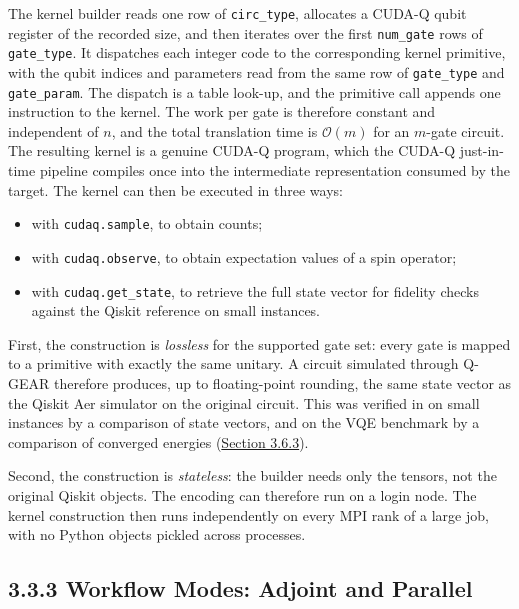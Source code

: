 \documentclass{report}
\theoremstyle{plain}
\theoremstyle{definition}
\theoremstyle{remark}
\newcommand{\bigO}[1]{\mathcal{O}\!\left(#1\right)}
\begin{document}
The kernel builder reads one row of \texttt{circ\_type}, allocates a CUDA-Q qubit register of the recorded size, and then iterates over the first \texttt{num\_gate} rows of \texttt{gate\_type}. It dispatches each integer code to the corresponding kernel primitive, with the qubit indices and parameters read from the same row of \texttt{gate\_type} and \texttt{gate\_param}. The dispatch is a table look-up, and the primitive call appends one instruction to the kernel. The work per gate is therefore constant and independent of $n$, and the total translation time is $\bigO{m}$ for an $m$-gate circuit. The resulting kernel is a genuine CUDA-Q program, which the CUDA-Q just-in-time pipeline compiles once into the intermediate representation consumed by the target. The kernel can then be executed in three ways:
\begin{itemize}
  \item with \texttt{cudaq.sample}, to obtain counts;
  \item with \texttt{cudaq.observe}, to obtain expectation values of a spin operator;
  \item with \texttt{cudaq.get\_state}, to retrieve the full state vector for fidelity checks against the Qiskit reference on small instances.
\end{itemize}

First, the construction is \emph{lossless} for the supported gate set: every gate is mapped to a primitive with exactly the same unitary. A circuit simulated through Q-GEAR therefore produces, up to floating-point rounding, the same state vector as the Qiskit Aer simulator on the original circuit. This was verified in \cite{guo2025qgear} on small instances by a comparison of state vectors, and on the VQE benchmark by a comparison of converged energies (\hyperref[sec:qgear:results-comparison]{Section 3.6.3}).

Second, the construction is \emph{stateless}: the builder needs only the tensors, not the original Qiskit objects. The encoding can therefore run on a login node. The kernel construction then runs independently on every MPI rank of a large job, with no Python objects pickled across processes.

\subsection{3.3.3 Workflow Modes: Adjoint and Parallel}\label{sec:qgear:modes}
\end{document}
